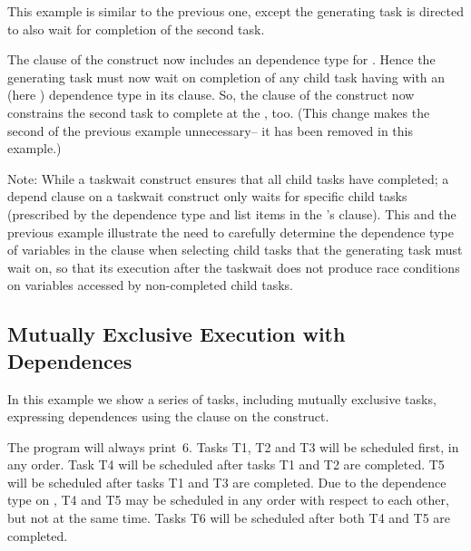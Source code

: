 


This example is similar to the previous one, except the generating task is
directed to also wait for completion of the second task.

The  clause of the  construct now includes an
 dependence type for .  Hence the generating task must now
wait on completion of any child task having  with an 
(here ) dependence type in its  clause.
So, the  clause of the  construct now constrains
the second task to complete at the , too.
(This change makes the second  of the previous example unnecessary--
it has been removed in this example.)

Note: While a taskwait construct ensures that all child tasks have completed; a depend clause on a taskwait
construct only waits for specific child tasks (prescribed by the dependence type and list
items in the 's  clause).
This and the previous example illustrate the need to carefully determine
the dependence type of variables in the   clause
when selecting child tasks that the generating task must wait on, so that its execution after the
taskwait does not produce race conditions on variables accessed by non-completed child tasks.



\pagebreak
\subsection{Mutually Exclusive Execution with Dependences}
\label{subsec:task_dep_mutexinoutset}

In this example we show a series of tasks, including mutually exclusive
tasks, expressing dependences using the  clause on the
 construct.

The program will always print~6. Tasks T1, T2 and T3 will be scheduled first,
in any order. Task T4 will be scheduled after tasks T1 and T2 are
completed. T5 will be scheduled after tasks T1 and T3 are completed. Due
to the  dependence type on , T4 and T5 may be
scheduled in any order with respect to each other, but not at the same
time. Tasks T6 will be scheduled after both T4 and T5 are completed.

